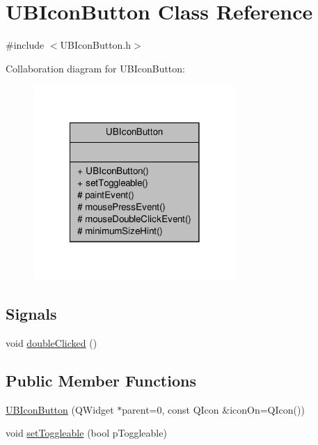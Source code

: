 \hypertarget{class_u_b_icon_button}{\section{U\-B\-Icon\-Button Class Reference}
\label{d5/d7f/class_u_b_icon_button}
}


{\ttfamily \#include $<$U\-B\-Icon\-Button.\-h$>$}



Collaboration diagram for U\-B\-Icon\-Button\-:
\nopagebreak
\begin{figure}[H]
\begin{center}
\leavevmode
\includegraphics[width=218pt]{d0/dc0/class_u_b_icon_button__coll__graph}
\end{center}
\end{figure}
\subsection*{Signals}
\begin{DoxyCompactItemize}
\item 
void \hyperlink{class_u_b_icon_button_a3e3bbc9b389eb0fea1a2f86519fe6187}{double\-Clicked} ()
\end{DoxyCompactItemize}
\subsection*{Public Member Functions}
\begin{DoxyCompactItemize}
\item 
\hyperlink{class_u_b_icon_button_a87f92b0abd00c9b83bc1efc8b50715b3}{U\-B\-Icon\-Button} (Q\-Widget $\ast$parent=0, const Q\-Icon \&icon\-On=Q\-Icon())
\item 
void \hyperlink{class_u_b_icon_button_aee571137323e2260596fb64412107625}{set\-Toggleable} (bool p\-Toggleable)
\end{DoxyCompactItemize}
